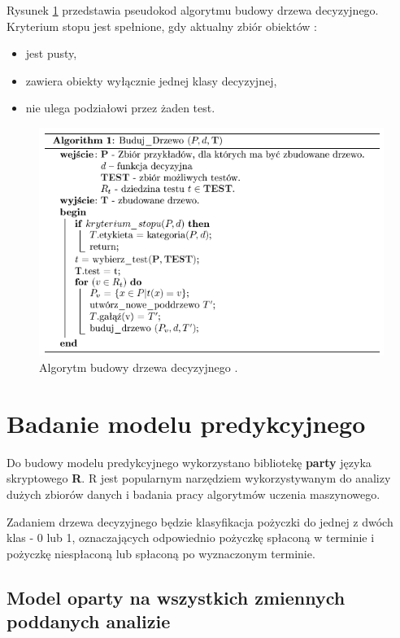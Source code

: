 Rysunek \ref{tree:algorithm} przedstawia pseudokod algorytmu budowy drzewa decyzyjnego. Kryterium stopu jest spełnione, gdy aktualny zbiór obiektów \cite{treeMIMUW}:

\begin{itemize}
	\item jest pusty,
	\item zawiera obiekty wyłącznie jednej klasy decyzyjnej,
	\item nie ulega podziałowi przez żaden test.
\end{itemize}


\begin{figure}[h] \centering %
	\includegraphics[scale=0.5]{img/tree_algorithm.png}
	\caption{Algorytm budowy drzewa decyzyjnego \cite{PJWSTK}.}
	\label{tree:algorithm}
\end{figure}

\section{Badanie modelu predykcyjnego}

Do budowy modelu predykcyjnego wykorzystano bibliotekę \textbf{party} języka skryptowego \textbf{R}. R jest popularnym narzędziem wykorzystywanym do analizy dużych zbiorów danych i badania pracy algorytmów uczenia maszynowego.

Zadaniem drzewa decyzyjnego będzie klasyfikacja pożyczki do jednej z dwóch klas - 0 lub 1, oznaczających odpowiednio pożyczkę spłaconą w terminie i pożyczkę niespłaconą lub spłaconą po wyznaczonym terminie.

\subsection{Model oparty na wszystkich zmiennych poddanych analizie}

